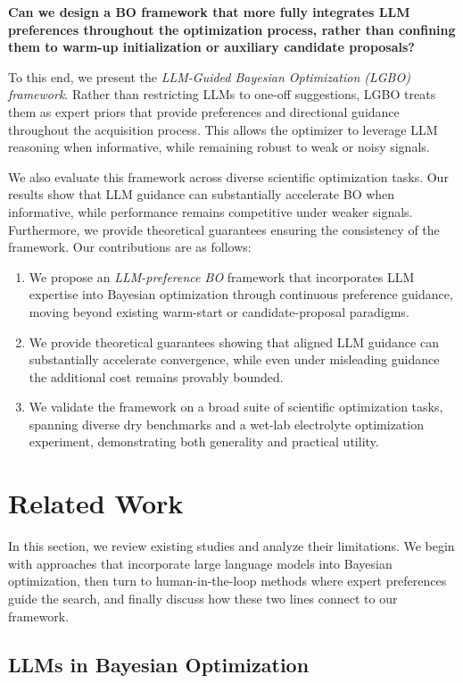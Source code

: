 \documentclass{article} %
\begin{document}
\textbf{Can we design a BO framework that more fully integrates LLM preferences throughout the optimization process, rather than confining them to warm-up initialization or auxiliary candidate proposals?}  

To this end, we present the \emph{LLM-Guided Bayesian Optimization (LGBO) framework}. Rather than restricting LLMs to one-off suggestions, LGBO treats them as expert priors that provide preferences and directional guidance throughout the acquisition process. This allows the optimizer to leverage LLM reasoning when informative, while remaining robust to weak or noisy signals.


We also evaluate this framework across diverse scientific optimization tasks. Our results show that LLM guidance can substantially accelerate BO when informative, while performance remains competitive under weaker signals. Furthermore, we provide theoretical guarantees ensuring the consistency of the framework.
Our contributions are as follows:
\begin{enumerate}
    \item We propose an \emph{LLM-preference BO} framework that incorporates LLM expertise into Bayesian optimization through continuous preference guidance, moving beyond existing warm-start or candidate-proposal paradigms.  
    \item We provide theoretical guarantees showing that aligned LLM guidance can substantially accelerate convergence, while even under misleading guidance the additional cost remains provably bounded.  
    \item We validate the framework on a broad suite of scientific optimization tasks, spanning diverse dry benchmarks and a wet-lab electrolyte optimization experiment, demonstrating both generality and practical utility.  
\end{enumerate}



\section{Related Work}
In this section, we review existing studies and analyze their limitations. We begin with approaches that incorporate large language models into Bayesian optimization, then turn to human-in-the-loop methods where expert preferences guide the search, and finally discuss how these two lines connect to our framework.

\subsection{LLMs in Bayesian Optimization}
\end{document}
